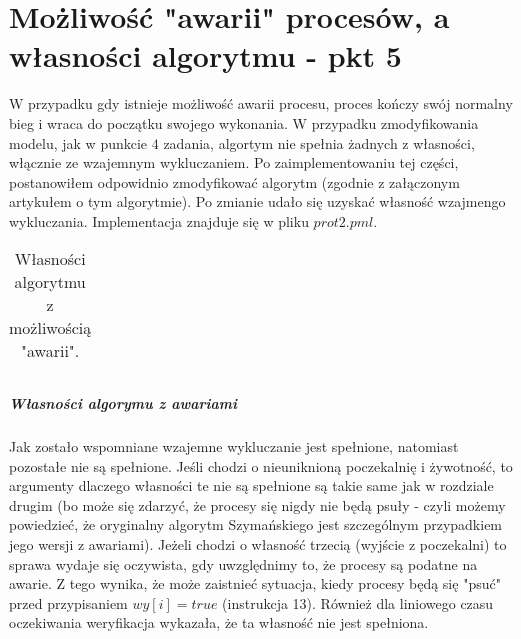 \documentclass[oneside]{book}
\begin{document}
\chapter{Możliwość "awarii" procesów, a własności algorytmu - pkt 5}
W przypadku gdy istnieje możliwość awarii procesu, proces kończy swój normalny bieg i wraca do początku swojego wykonania. W przypadku zmodyfikowania modelu, jak w punkcie $4$ zadania, algortym nie spełnia żadnych z własności, włącznie ze wzajemnym wykluczaniem. Po zaimplementowaniu tej części, postanowiłem odpowidnio zmodyfikować algorytm (zgodnie z załączonym artykułem o tym algorytmie). Po zmianie udało się uzyskać własność wzajmengo wykluczania. Implementacja znajduje się w pliku $prot2.pml$.\\

 
\begin{table}[H]                                                                                                                                                             
\centering
  \begin{tabular}{| l |r |}                                                      
   \hline                                                                             \hline
   \end{tabular}                                                                
  \caption{Własności algorytmu z możliwością "awarii".}                 
 \end{table} 

\paragraph{Własności algorymu z awariami} Jak zostało wspomniane wzajemne wykluczanie jest spełnione, natomiast pozostałe nie są spełnione. Jeśli chodzi o nieuniknioną poczekalnię i żywotność, to argumenty dlaczego własności te nie są spełnione są takie same jak w rozdziale drugim (bo może się zdarzyć, że procesy się nigdy nie będą psuły - czyli możemy powiedzieć, że oryginalny algorytm Szymańskiego jest szczególnym przypadkiem jego wersji z awariami). Jeżeli chodzi o własność trzecią (wyjście z poczekalni) to sprawa wydaje się oczywista, gdy uwzględnimy to, że procesy są podatne na awarie. Z tego wynika, że może zaistnieć sytuacja, kiedy procesy będą się "psuć" przed przypisaniem $wy[i] = true$ (instrukcja 13). Również dla liniowego czasu oczekiwania weryfikacja wykazała, że ta własność nie jest spełniona.
\end{document}
